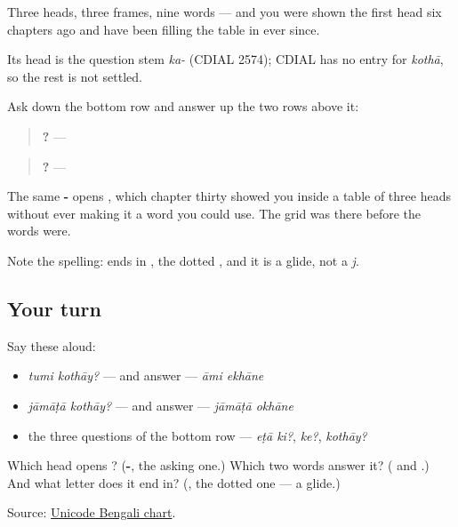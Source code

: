 Three heads, three frames, nine words — and you were shown the first head six chapters ago and have been filling the table in ever since.

\begin{cousinweb}
Its head is the question stem \emph{ka-} (CDIAL 2574); CDIAL has no entry for \emph{kothā}, so the rest is not settled.
\end{cousinweb}

\begin{grammarlens}[title={Grammar Lens: the question and its answer are the same shape}]
Ask down the bottom row and answer up the two rows above it:

\begin{quote}
\textbf{ ?} — \textbf{ }
\end{quote}

\begin{quote}
\textbf{ ?} — \textbf{ }
\end{quote}

The same \textbf{-} opens \textbf{}, which chapter thirty showed you inside a table of three heads without ever making it a word you could use. The grid was there before the words were.

Note the spelling: \textbf{} ends in \textbf{}, the dotted \textbf{}, and it is a glide, not a \emph{j}.
\end{grammarlens}

\subsection*{Your turn}
Say these aloud:

\begin{itemize}
\raggedright
  \item \emph{tumi kothāy?} — and answer — \emph{āmi ekhāne}
  \item \emph{jāmāṭā kothāy?} — and answer — \emph{jāmāṭā okhāne}
  \item the three questions of the bottom row — \emph{eṭā ki?}, \emph{ke?}, \emph{kothāy?}
\end{itemize}

\begin{tcolorbox}[breakable,colback=teal!4,colframe=teal!35!black,title={Before you move on}]
Which head opens \textbf{}? (\textbf{-}, the asking one.) Which two words answer it? (\textbf{} and \textbf{}.) And what letter does it end in? (\textbf{}, the dotted one — a glide.)

Source: \href{https://www.unicode.org/charts/PDF/U0980.pdf}{Unicode Bengali chart}.
\end{tcolorbox}
